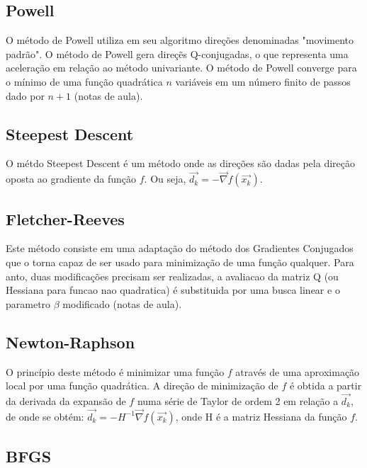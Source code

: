 \documentclass[10pt, a4paper]{article}
\begin{document}
\subsection{Powell}

O m\'etodo de Powell utiliza em seu algoritmo dire\c c\~oes denominadas "movimento padr\~ao". O m\'etodo de Powell gera dire\c c\~es Q-conjugadas, o que representa uma acelera\c c\~ao em rela\c c\~ao ao m\'etodo univariante. O m\'etodo de Powell converge para o m\'inimo de uma fun\c c\~ao quadr\'atica $n$ vari\'aveis em um n\'umero finito de passos dado por $n+1$ (notas de aula).

\subsection{Steepest Descent}

O m\'etdo Steepest Descent \'e um m\'etodo onde as dire\c c\~oes s\~ao dadas pela dire\c c\~ao oposta ao gradiente da fun\c c\~ao $f$. Ou seja, $\vec{d_{k}} = -\vec{\nabla} f(\vec{x_{k}})$.

\subsection{Fletcher-Reeves}

Este m\'etodo consiste em uma adapta\c c\~ao do m\'etodo dos Gradientes Conjugados que o torna capaz de ser usado para minimiza\c c\~ao de uma fun\c c\~ao qualquer. Para anto, duas modifica\c c\~oes precisam ser realizadas, a avaliacao da matriz Q (ou Hessiana para funcao nao quadratica) \'e substituida por uma busca linear e o parametro $\beta$ modificado (notas de aula).

\subsection{Newton-Raphson}

O princ\'ipio deste m\'etodo \'e minimizar uma fun\c c\~ao $f$ atrav\'es de uma aproxima\c c\~ao local por uma fun\c c\~ao quadr\'atica. A dire\c c\~ao de minimiza\c c\~ao de $f$ \'e obtida a partir da derivada da expans\~ao de $f$ numa s\'erie de Taylor de ordem 2 em rela\c c\~ao a $\vec{d_{k}}$, de onde se obt\'em: $\vec{d_{k}}=-H^{-1} \vec{\nabla} f(\vec{x_{k}})$, onde H \'e a matriz Hessiana da fun\c c\~ao $f$.

\subsection{BFGS}
\end{document}
